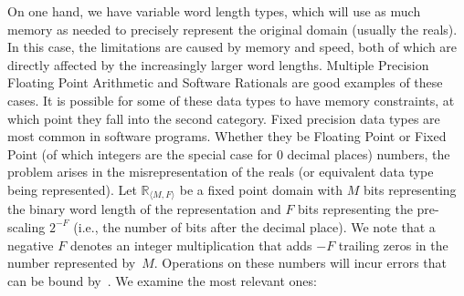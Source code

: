 \documentclass[sigconf]{llncs}
\begin{document}
On one hand, we have variable word length types, which will use as much
memory as needed to precisely represent the original domain (usually the
reals).  In this case, the limitations are caused by memory and speed, both
of which are directly affected by the increasingly larger word lengths. 
Multiple Precision Floating Point Arithmetic and Software Rationals are good
examples of these cases.  It is possible for some of these data types to
have memory constraints, at which point they fall into the second category. 
Fixed precision data types are most common in software programs.  Whether
they be Floating Point or Fixed Point (of which integers are the special
case for 0 decimal places) numbers, the problem arises in the
misrepresentation of the reals (or equivalent data type being represented). 
Let $\mathbb{R}_{\langle M,F \rangle}$ be a fixed point domain with $M$ bits
representing the binary word length of the representation and $F$ bits
representing the pre-scaling $2^{-F}$ (i.e., the number of bits after
the decimal place).  We note that a negative $F$ denotes an integer
multiplication that adds $-F$ trailing zeros in the number represented
by~$M$.
%
Operations on these numbers will incur errors that can be bound
by~\cite{DBLP:conf/arith/BrainTRW15}.  We examine the most relevant ones:
%
\end{document}
